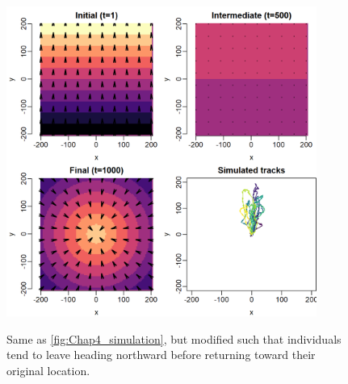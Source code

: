 \lstset{style=TMBcode}
 

\lstset{style=Rcode}


\begin{figure}[!ht]
    \caption[Simulated movement for correlated tracks of central-place foragers]{Same as \ref{fig:Chap4_simulation}, but modified such that individuals tend to leave heading northward before returning toward their original location.}
    \centering
    \includegraphics[width=4in]{Chap_4/Tracks-Correlated.png}
    \label{fig:Chap4_Preference_correlated}
\end{figure}

